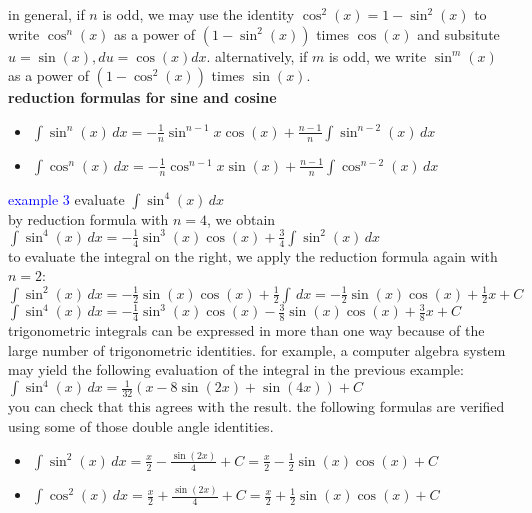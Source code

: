 \documentclass{article}
\begin{document}
in general, if $n$ is odd, we may use the identity $\cos^2(x) = 1 - \sin^2(x)$ to write $\cos^n(x)$ as a power of $(1 - \sin^2(x))$ times $\cos(x)$ and subsitute $u = \sin(x), du = \cos(x)dx$. alternatively, if $m$ is odd, we write $\sin^m(x)$ as a power of $(1 - \cos^2(x))$ times $\sin(x)$.\\

\textbf{reduction formulas for sine and cosine}
	\begin{itemize}
		\item $\int\sin^n(x)\,dx = -\frac{1}{n}\sin^{n-1}x\cos(x) + \frac{n-1}{n}\int\sin^{n-2}(x)\,dx$
		\item $\int\cos^n(x)\,dx = -\frac{1}{n}\cos^{n-1}x\sin(x) + \frac{n-1}{n}\int\cos^{n-2}(x)\,dx$ 
	\end{itemize}

\textcolor{blue}{example 3} evaluate $\int\sin^4(x)\,dx$\\
by reduction formula with $n = 4$, we obtain\\
$\int\sin^4(x)\,dx = -\frac{1}{4}\sin^3(x)\cos(x) + \frac{3}{4}\int\sin^2(x)\,dx$\\ to evaluate the integral on the right, we apply the reduction formula again with $n = 2$:\\ $\int\sin^2(x)\,dx = -\frac{1}{2}\sin(x)\cos(x) + \frac{1}{2}\int\,dx = -\frac{1}{2}\sin(x)\cos(x) + \frac{1}{2}x + C$\\ $\int\sin^4(x)\,dx = -\frac{1}{4}\sin^3(x)\cos(x) - \frac{3}{8}\sin(x)\cos(x) + \frac{3}{8}x + C$\\ trigonometric integrals can be expressed in more than one way because of the large number of trigonometric identities. for example, a computer algebra system may yield the following evaluation of the integral in the previous example:\\ $\int\sin^4(x)\,dx = \frac{1}{32}(x - 8\sin(2x) + \sin(4x)) + C$\\ you can check that this agrees with the result. the following formulas are verified using some of those double angle identities.
	\begin{itemize}
		\item $\int\sin^2(x)\,dx = \frac{x}{2} - \frac{\sin(2x)}{4} + C = \frac{x}{2} - \frac{1}{2}\sin(x)\cos(x) + C$
		\item $\int\cos^2(x)\,dx = \frac{x}{2} + \frac{\sin(2x)}{4} + C = \frac{x}{2} + \frac{1}{2}\sin(x)\cos(x) + C$ 
	\end{itemize}
\end{document}

